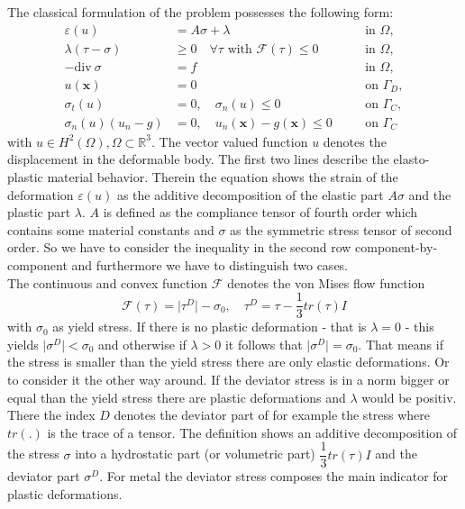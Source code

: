 \documentclass{article}
\begin{document}
The classical formulation of the problem possesses the following form:
\begin{align*}
 \varepsilon(u) &= A\sigma + \lambda & &\quad\text{in } \Omega,\\
 \lambda(\tau - \sigma) &\geq 0\quad\forall\tau\text{ with
 }\mathcal{F}(\tau)\leq 0 & &\quad\text{in } \Omega,\\
 -\textrm{div}\ \sigma &= f & &\quad\text{in } \Omega,\\
 u(\mathbf x) &= 0 & &\quad\text{on }\Gamma_D,\\
 \sigma_t(u) &= 0,\quad\sigma_n(u)\leq 0 & &\quad\text{on }\Gamma_C,\\
\sigma_n(u)(u_n - g) &= 0,\quad u_n(\mathbf x) - g(\mathbf x) \leq 0 & &\quad\text{on } \Gamma_C
\end{align*}
with $u\in H^2(\Omega),\Omega\subset\mathbb{R}^3$.  The vector valued
function $u$ denotes the displacement in the deformable body. The first two lines describe the
elasto-plastic material behavior. Therein the equation shows the
strain of the deformation $\varepsilon (u)$ as the additive decomposition of the
elastic part $A\sigma$ and the plastic part $\lambda$. $A$ is defined as the compliance tensor of fourth order which contains some material constants and $\sigma$ as the
symmetric stress tensor of second order. So we have to consider the inequality in the second
row component-by-component and furthermore we have to distinguish two cases.\\
The continuous and convex function $\mathcal{F}$ denotes the von Mises flow function
$$\mathcal{F}(\tau) = \vert\tau^D\vert - \sigma_0,\quad \tau^D = \tau -
\dfrac{1}{3}tr(\tau)I$$
with $\sigma_0$ as yield stress. If there is no plastic deformation - that is $\lambda=0$ - this yields $\vert\sigma^D\vert < \sigma_0$
and otherwise if $\lambda > 0$ it follows that $\vert\sigma^D\vert = \sigma_0$.
That means if the stress is smaller than the yield stress there are only elastic
deformations. Or to consider it the other way around. If the deviator stress is
in a norm bigger or equal than the yield stress there are plastic deformations
and $\lambda$ would be positiv.\\
There the index $D$ denotes the deviator part of for example the stress where
$tr(.)$ is the trace of a tensor. The definition shows an additive decomposition
of the stress $\sigma$ into a hydrostatic part (or volumetric part) $\dfrac{1}{3}tr(\tau)I$ and the deviator
part $\sigma^D$. For metal the deviator stress composes the main indicator for
plastic deformations.\\
\end{document}
